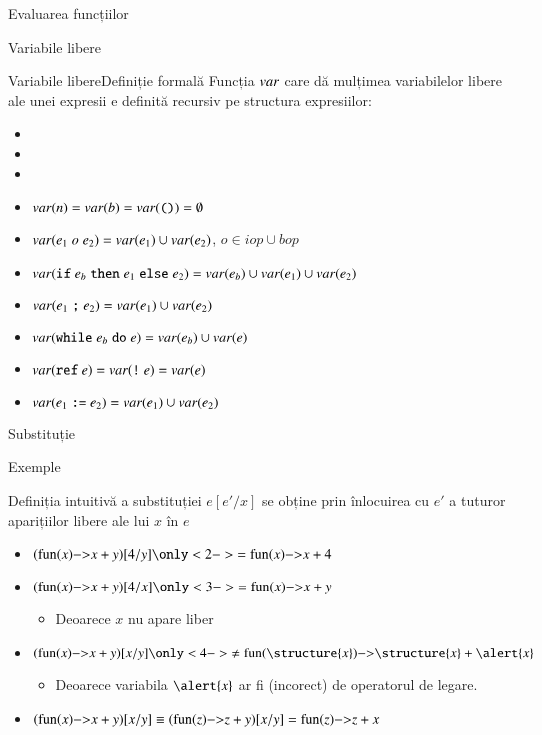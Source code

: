 \documentclass[xcolor=pdftex,romanian,colorlinks]{beamer}
\begin{document}
\begin{section}{Evaluarea funcțiilor}
\begin{subsection}{Variabile libere}
\begin{frame}{Variabile libere}{Definiție formală}
Funcția $\mathop{var}$ care dă mulțimea variabilelor libere ale unei expresii e definită recursiv pe structura expresiilor:
\begin{itemize}
\item {}
\item {}
\item {}
\item $\mathop{var}(n) = \mathop{var}(b) = \mathop{var}(\mathrel{\text{\ttfamily ()}}) = \emptyset$
\item $\mathop{var}(e_1 \mathrel{o} e_2) = \mathop{var}(e_1) \cup \mathop{var}(e_2)$, $o\in {iop}\cup {bop}$
\item $\mathop{var}(\mathrel{\text{\ttfamily if}} e_b \mathrel{\text{\ttfamily then}} e_1 \mathrel{\text{\ttfamily else}} e_2) = \mathop{var}(e_b) \cup\mathop{var}(e_1) \cup\mathop{var}(e_2)$
\item $\mathop{var}(e_1 \mathrel{\text{\ttfamily ;}} e_2) = \mathop{var}(e_1) \cup \mathop{var}(e_2)$
\item $\mathop{var}(\mathrel{\text{\ttfamily while}} e_b \mathrel{\text{\ttfamily do}} e) = \mathop{var}(e_b) \cup \mathop{var}(e)$
\item $\mathop{var}(\mathrel{\text{\ttfamily ref}} e) = \mathop{var}(\mathrel{\text{\ttfamily !}} e) = \mathop{var}(e)$
\item $\mathop{var}(e_1 \mathrel{\text{\ttfamily :=}} e_2) = \mathop{var}(e_1) \cup \mathop{var}(e_2)$
\end{itemize}
\end{frame}
\end{subsection}
\begin{subsection}{Substituție}
\begin{frame}{}{Exemple}
\begin{block}{Definiția intuitivă a substituției}
$e[e' / x]$ se obține prin înlocuirea cu $e'$ a tuturor aparițiilor libere ale lui $x$ în $e$
\end{block}

\vfill
\begin{itemize}
\item $(\fun{x}{x + y})[4/y]\only<2->{=\fun{x}{x + 4}}$
\item<2-> $(\fun{x}{x + y})[4/x]\only<3->{=\fun{x}{x + y}}$
\begin{itemize}
\item<3-> Deoarece $x$ nu apare liber
\end{itemize}
\item<3-> $(\fun{x}{x + y})[x/y]\only<4->{\not=\fun{\structure{x}}{\structure{x} + \alert{x}}}$
\begin{itemize}
\item<4-> Deoarece variabila $\alert{x}$ ar fi  (incorect) de operatorul de legare.
\end{itemize}
\item<5-> $(\fun{x}{x + y})[x/y] \equiv (\fun{z}{z + y})[x/y] = \fun{z}{z + x}$
\end{itemize}
\end{frame}


\end{subsection}
\end{section}
\end{document}

